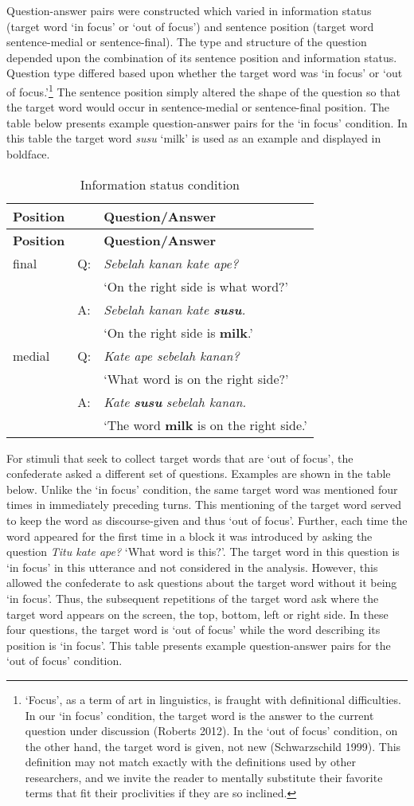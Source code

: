 \documentclass[]{article}
\let\rmarkdownfootnote\footnote%
\def\footnote{\protect\rmarkdownfootnote}
\begin{document}
Question-answer pairs were constructed which varied in information
status (target word `in focus' or `out of focus') and sentence position
(target word sentence-medial or sentence-final). The type and structure
of the question depended upon the combination of its sentence position
and information status. Question type differed based upon whether the
target word was `in focus' or `out of focus.'\footnote{`Focus', as a
  term of art in linguistics, is fraught with definitional difficulties.
  In our `in focus' condition, the target word is the answer to the
  current question under discussion (Roberts 2012). In the `out of
  focus' condition, on the other hand, the target word is given, not new
  (Schwarzschild 1999). This definition may not match exactly with the
  definitions used by other researchers, and we invite the reader to
  mentally substitute their favorite terms that fit their proclivities
  if they are so inclined.} The sentence position simply altered the
shape of the question so that the target word would occur in
sentence-medial or sentence-final position. The table below presents
example question-answer pairs for the `in focus' condition. In this
table the target word \emph{susu} `milk' is used as an example and
displayed in boldface.

\begin{longtable}[]{@{}lll@{}}
\caption{Information status condition}\tabularnewline
\toprule
\textbf{Position} & & \textbf{Question/Answer}\tabularnewline
\midrule
\endfirsthead
\toprule
\textbf{Position} & & \textbf{Question/Answer}\tabularnewline
\midrule
\endhead
final & Q: & \emph{Sebelah kanan kate ape?}\tabularnewline
& & `On the right side is what word?'\tabularnewline
& A: & \emph{Sebelah kanan kate \textbf{susu}.}\tabularnewline
& & `On the right side is \textbf{milk}.'\tabularnewline
medial & Q: & \emph{Kate ape sebelah kanan?}\tabularnewline
& & `What word is on the right side?'\tabularnewline
& A: & \emph{Kate} \textbf{\emph{susu}} \emph{sebelah
kanan.}\tabularnewline
& & `The word \textbf{milk} is on the right side.'\tabularnewline
\bottomrule
\end{longtable}

For stimuli that seek to collect target words that are `out of focus',
the confederate asked a different set of questions. Examples are shown
in the table below. Unlike the `in focus' condition, the same target
word was mentioned four times in immediately preceding turns. This
mentioning of the target word served to keep the word as discourse-given
and thus `out of focus'. Further, each time the word appeared for the
first time in a block it was introduced by asking the question
\emph{Titu kate ape?} `What word is this?'. The target word in this
question is `in focus' in this utterance and not considered in the
analysis. However, this allowed the confederate to ask questions about
the target word without it being `in focus'. Thus, the subsequent
repetitions of the target word ask where the target word appears on the
screen, the top, bottom, left or right side. In these four questions,
the target word is `out of focus' while the word describing its position
is `in focus'. This table presents example question-answer pairs for the
`out of focus' condition.
\end{document}
